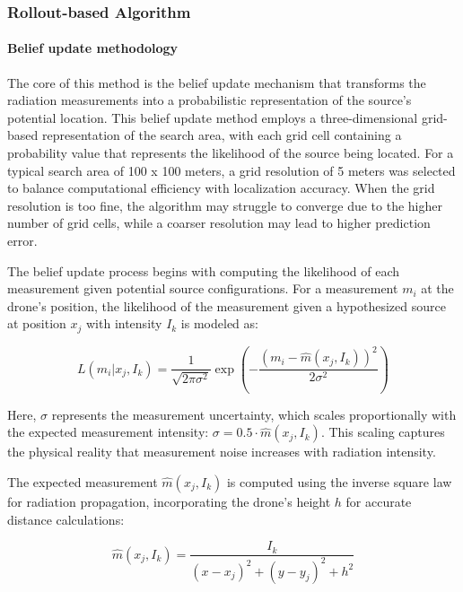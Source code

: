 \documentclass[../report.tex]{subfiles}
\begin{document}
    \subsubsection{Rollout-based Algorithm}

    \paragraph{Belief update methodology}
    The core of this method is the belief update mechanism that transforms the radiation measurements into a probabilistic representation of the source's potential location. This belief update 
    method employs a three-dimensional grid-based representation of the search area, with each grid cell containing a probability value that represents the likelihood of the source being located.
    For a typical search area of 100 x 100 meters, a grid resolution of 5 meters was selected to balance computational efficiency with localization accuracy. When the grid 
    resolution is too fine, the algorithm may struggle to converge due to the higher number of grid cells, while a coarser resolution may lead to higher prediction error.

    The belief update process begins with computing the likelihood of each measurement given potential source configurations. For a measurement $m_i$ at the drone's position, the likelihood of 
    the measurement given a hypothesized source at position $x_j$ with intensity $I_k$ is modeled as:

    \begin{equation}
        L(m_i | x_j, I_k) = \frac{1}{\sqrt{2\pi\sigma^2}} \exp\left(-\frac{(m_i - \hat{m}(x_j, I_k))^2}{2\sigma^2}\right)
        \label{eq:rollout_likelihood}
    \end{equation}

    Here, $\sigma$ represents the measurement uncertainty, which scales proportionally with the expected measurement intensity: $\sigma = 0.5 \cdot \hat{m}(x_j, I_k)$. This scaling captures the physical reality that measurement noise increases with radiation intensity.

    The expected measurement $\hat{m}(x_j, I_k)$ is computed using the inverse square law for radiation propagation, incorporating the drone's height $h$ for accurate distance calculations:

    \begin{equation}
        \hat{m}(x_j, I_k) = \frac{I_k}{(x - x_j)^2 + (y - y_j)^2 + h^2}
    \end{equation}
\end{document}
